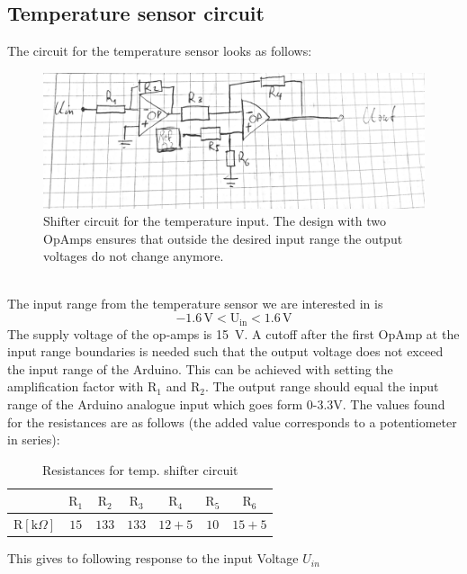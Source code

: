 \documentclass[12pt]{scrartcl}
\begin{document}
    \subsection{Temperature sensor circuit}
      The circuit for the temperature sensor looks as follows:
      \begin{figure}[h]
        \includegraphics[width = \textwidth]{circ.png}
        \caption{Shifter circuit for the temperature input. The design with
        two OpAmps ensures that outside the desired input range the output
        voltages do not change anymore.}
        \label{fig1}
      \end{figure}
      \\The input range from the temperature sensor we are interested in is
      $$-1.6 \, \text{V} < \text{U}_{\text{in}} < 1.6\, \text{V}$$
      The supply voltage of the op-amps is 15~V. A cutoff after
      the first OpAmp at the input range boundaries is needed such that the
      output voltage does not exceed the input range of the Arduino. This can be
      achieved with
      setting the amplification factor with $\text{R}_1$ and $\text{R}_2$. The output range
      should equal the input range of the Arduino analogue input which goes form
      0-3.3V. The values found for the resistances are as follows (the added value
      corresponds to a potentiometer in series): \\
      \begin{table}[H]\label{tempres}
        \begin{tabular}{l|c c c c c c}
          & $\text{R}_1$ & $\text{R}_2$ & $\text{R}_3$ & $\text{R}_4$
          & $\text{R}_5$ & $\text{R}_6$ \\
          \hline\vspace{5pt}
          $\text{R}[\text{k}\Omega]$ & $15$ & $133$ & $133$ & $12 + 5$ & $10$
          & $15 + 5$
        \end{tabular}
        \caption{Resistances for temp. shifter circuit}
      \end{table}
      This gives to following response to the input Voltage $U_{in}$\\
\end{document}
